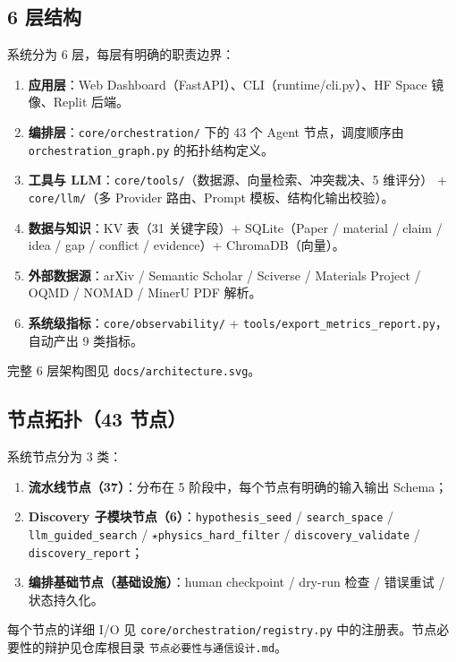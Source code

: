 \documentclass[11pt,a4paper]{article}
\begin{document}
\subsection{6 层结构}

系统分为 6 层，每层有明确的职责边界：

\begin{enumerate}[leftmargin=2em]
\item \textbf{应用层}：Web Dashboard（FastAPI）、CLI（runtime/cli.py）、HF Space 镜像、Replit 后端。
\item \textbf{编排层}：\texttt{core/orchestration/} 下的 43 个 Agent 节点，调度顺序由 \texttt{orchestration\_graph.py} 的拓扑结构定义。
\item \textbf{工具与 LLM}：\texttt{core/tools/}（数据源、向量检索、冲突裁决、5 维评分） + \texttt{core/llm/}（多 Provider 路由、Prompt 模板、结构化输出校验）。
\item \textbf{数据与知识}：KV 表（31 关键字段）+ SQLite（Paper / material / claim / idea / gap / conflict / evidence）+ ChromaDB（向量）。
\item \textbf{外部数据源}：arXiv / Semantic Scholar / Sciverse / Materials Project / OQMD / NOMAD / MinerU PDF 解析。
\item \textbf{系统级指标}：\texttt{core/observability/} + \texttt{tools/export\_metrics\_report.py}，自动产出 9 类指标。
\end{enumerate}

完整 6 层架构图见 \texttt{docs/architecture.svg}。

\subsection{节点拓扑（43 节点）}

系统节点分为 3 类：

\begin{enumerate}[leftmargin=2em]
\item \textbf{流水线节点（37）}：分布在 5 阶段中，每个节点有明确的输入输出 Schema；
\item \textbf{Discovery 子模块节点（6）}：\texttt{hypothesis\_seed} / \texttt{search\_space} / \texttt{llm\_guided\_search} / $\star$\texttt{physics\_hard\_filter} / \texttt{discovery\_validate} / \texttt{discovery\_report}；
\item \textbf{编排基础节点（基础设施）}：human checkpoint / dry-run 检查 / 错误重试 / 状态持久化。
\end{enumerate}

每个节点的详细 I/O 见 \texttt{core/orchestration/registry.py} 中的注册表。节点必要性的辩护见仓库根目录 \texttt{节点必要性与通信设计.md}。
\end{document}
